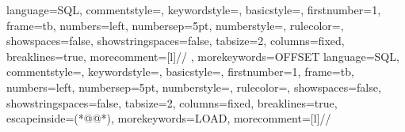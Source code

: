 		{
			language=SQL,
			commentstyle=\color{vbagreen},  %
			keywordstyle=\color{vbablue},   %
			basicstyle=\footnotesize\ttfamily, %
			firstnumber=1,                	%
			frame=tb,	                	%
			numbers=left,                   %
			numbersep=5pt,                  %
			numberstyle=\tiny\color{gray},	%
			rulecolor=\color{black},        %
			showspaces=false,               %
			showstringspaces=false,         %
			tabsize=2,		                %
			columns=fixed,					%
			breaklines=true,				%
			morecomment=[l]{//}	,			%
			morekeywords={OFFSET}
		}
		{
				language=SQL,
				commentstyle=\color{vbagreen},  %
				keywordstyle=\color{vbablue},   %
				basicstyle=\footnotesize\ttfamily, %
				firstnumber=1,                	%
				frame=tb,	                	%
				numbers=left,                   %
				numbersep=5pt,                  %
				numberstyle=\tiny\color{gray},	%
				rulecolor=\color{black},        %
				showspaces=false,               %
				showstringspaces=false,         %
				tabsize=2,		                %
				columns=fixed,					%
				breaklines=true,				%
				escapeinside={(*@}{@*)},		%
				morekeywords={LOAD},				%
				morecomment=[l]{//}				%
		}
	
